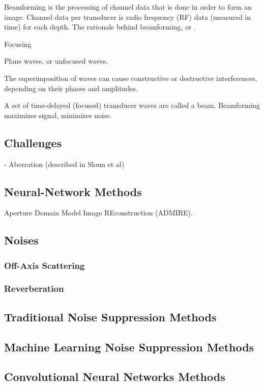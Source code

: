  Beamforming is the processing of channel data that is done in order to form an image. Channel data per transducer is radio frequency (RF) data (measured in time) for each depth. The rationale behind beamforming, or .

 Focusing


 Plane waves, or unfocused waves.

 The superimposition of waves can cause constructive or destructive interferences, depending on their phases and amplitudes.

 A set of time-delayed (focused) transducer waves are called a beam. Beamforming maximizes signal, minimizes noise.

%

\subsection{Challenges}
- Aberration (described in Sloun et al)


\subsection{Neural-Network Methods}
Aperture Domain Model Image REconstruction (ADMIRE)\cite{admire2017}.


\subsection{Noises}
\subsubsection{Off-Axis Scattering}
\subsubsection{Reverberation}



\subsection{Traditional Noise Suppression Methods}
\subsection{Machine Learning Noise Suppression Methods}
\subsection{Convolutional Neural Networks Methods}


